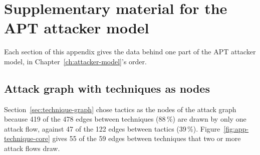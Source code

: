 \documentclass{cshonours}
\begin{document}
\chapter{Supplementary material for the APT attacker model}
\label{app:movement}

Each section of this appendix gives the data behind one part of the APT
attacker model, in Chapter~\ref{ch:attacker-model}'s order.


\section{Attack graph with techniques as nodes}
\label{app:full-graph}

Section~\ref{sec:technique-graph} chose tactics as the nodes of the attack
graph because 419 of the 478 edges between techniques (88\,\%) are drawn by only one attack
flow, against 47 of the 122 edges between tactics
(39\,\%). Figure~\ref{fig:app-technique-core} gives 55 of the 59 edges between
techniques that two or more attack flows draw.
\end{document}

